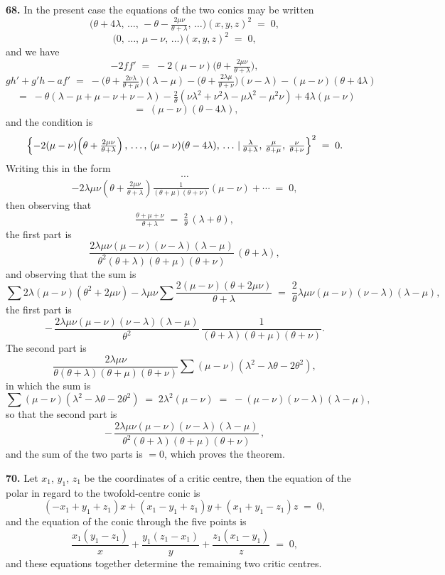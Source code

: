 \documentclass[11pt,a4paper]{article}
\providecommand{\mid}{\,|\,}
\begin{document}
\textbf{68.} In the present case the equations of the two conics may be written
\[
\bigl(\theta+4\lambda,\,\ldots,\,-\theta-\tfrac{2\mu\nu}{\theta+\lambda},\,\ldots\bigr)(x,y,z)^{2} \;=\; 0,
\]
\[
\bigl(0,\,\ldots,\,\mu-\nu,\,\ldots\bigr)(x,y,z)^{2} \;=\; 0,
\]
and we have
\[
-2 f f' \;=\; -2(\mu-\nu)\bigl(\theta+\tfrac{2\mu\nu}{\theta+\lambda}\bigr),
\]
\[
g h' + g' h - a f' \;=\; -\bigl(\theta+\tfrac{2\nu\lambda}{\theta+\mu}\bigr)(\lambda-\mu) - \bigl(\theta+\tfrac{2\lambda\mu}{\theta+\nu}\bigr)(\nu-\lambda) - (\mu-\nu)(\theta+4\lambda)
\]
\[
\;=\; -\theta(\lambda-\mu+\mu-\nu+\nu-\lambda) - \tfrac{2}{\theta}(\nu\lambda^{2}+\nu^{2}\lambda-\mu\lambda^{2}-\mu^{2}\nu)+4\lambda(\mu-\nu)
\]
\[
\;=\; (\mu-\nu)(\theta-4\lambda),
\]
and the condition is
\[
\Bigl\{-2(\mu-\nu)\!\left(\theta+\tfrac{2\mu\nu}{\theta+\lambda}\right),\,\ldots,\,(\mu-\nu)(\theta-4\lambda),\,\ldots\mid \tfrac{\lambda}{\theta+\lambda},\,\tfrac{\mu}{\theta+\mu},\,\tfrac{\nu}{\theta+\nu}\Bigr\}^{2} \;=\; 0.
\]
Writing this in the form
\[
\cdots
\]
\[
-2\lambda\mu\nu\!\left(\theta+\tfrac{2\mu\nu}{\theta+\lambda}\right)\tfrac{1}{(\theta+\mu)(\theta+\nu)}(\mu-\nu) + \cdots \;=\; 0,
\]
then observing that
\[
\tfrac{\theta+\mu+\nu}{\theta+\lambda} \;=\; \tfrac{2}{\theta}\,(\lambda+\theta),
\]
the first part is
\[
\frac{2\lambda\mu\nu(\mu-\nu)(\nu-\lambda)(\lambda-\mu)}{\theta^{2}(\theta+\lambda)(\theta+\mu)(\theta+\nu)}\,(\theta+\lambda),
\]
and observing that the sum is
\[
\sum 2\lambda(\mu-\nu)(\theta^{2}+2\mu\nu) - \lambda\mu\nu\sum\frac{2(\mu-\nu)(\theta+2\mu\nu)}{\theta+\lambda} \;=\; \frac{2}{\theta}\lambda\mu\nu(\mu-\nu)(\nu-\lambda)(\lambda-\mu),
\]
the first part is
\[
-\,\frac{2\lambda\mu\nu(\mu-\nu)(\nu-\lambda)(\lambda-\mu)}{\theta^{2}}\,\frac{1}{(\theta+\lambda)(\theta+\mu)(\theta+\nu)}.
\]
The second part is
\[
\frac{2\lambda\mu\nu}{\theta(\theta+\lambda)(\theta+\mu)(\theta+\nu)}\sum(\mu-\nu)(\lambda^{2}-\lambda\theta-2\theta^{2}),
\]
in which the sum is
\[
\sum(\mu-\nu)(\lambda^{2}-\lambda\theta-2\theta^{2}) \;=\; 2\lambda^{2}(\mu-\nu) \;=\; -(\mu-\nu)(\nu-\lambda)(\lambda-\mu),
\]
so that the second part is
\[
-\,\frac{2\lambda\mu\nu(\mu-\nu)(\nu-\lambda)(\lambda-\mu)}{\theta^{2}(\theta+\lambda)(\theta+\mu)(\theta+\nu)}\,,
\]
and the sum of the two parts is $=0$, which proves the theorem.

\medskip

\textbf{70.} Let $x_{1}$, $y_{1}$, $z_{1}$ be the coordinates of a critic centre, then the equation of the polar in regard to the twofold-centre conic is
\[
(-x_{1}+y_{1}+z_{1})x + (x_{1}-y_{1}+z_{1})y + (x_{1}+y_{1}-z_{1})z \;=\; 0,
\]
and the equation of the conic through the five points is
\[
\frac{x_{1}(y_{1}-z_{1})}{x} + \frac{y_{1}(z_{1}-x_{1})}{y} + \frac{z_{1}(x_{1}-y_{1})}{z} \;=\; 0,
\]
and these equations together determine the remaining two critic centres.
\end{document}
